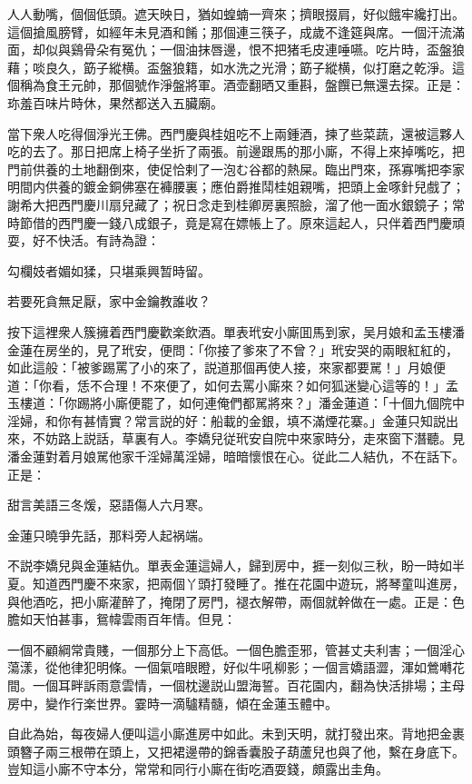 人人動嘴，個個低頭。遮天映日，猶如蝗蝻一齊來；擠眼掇肩，好似餓牢纔打出。這個搶風膀臂，如經年未見酒和餚；那個連三筷子，成歲不逢筵與席。一個汗流滿面，却似與鷄骨朵有冤仇；一個油抹唇邊，恨不把猪毛皮連唾嚥。吃片時，盃盤狼藉；啖良久，筯子縱横。盃盤狼籍，如水洗之光滑；筯子縱横，似打磨之乾淨。這個稱為食王元帥，那個號作淨盤將軍。酒壶翻晒又重斟，盤饌已無還去探。正是：珎羞百味片時休，果然都送入五臟廟。

當下衆人吃得個淨光王佛。西門慶與桂姐吃不上兩鍾酒，揀了些菜蔬，還被這夥人吃的去了。那日把席上椅子坐折了兩張。前邊跟馬的那小廝，不得上來掉嘴吃，把門前供養的土地翻倒來，使促恰剌了一泡む谷都的熱屎。臨出門來，孫寡嘴把李家明間内供養的鍍金銅佛塞在褲腰裏；應伯爵推鬦桂姐親嘴，把頭上金啄針兒戲了；謝希大把西門慶川扇兒藏了；祝日念走到桂卿房裏照臉，溜了他一面水銀鏡子；常時節借的西門慶一錢八成銀子，竟是寫在嫖帳上了。原來這起人，只伴着西門慶頑耍，好不快活。有詩為證：

勾欄妓者媚如猱，只堪乘興暂時留。

若要死貪無足厭，家中金鑰教誰收？

按下這裡衆人簇擁着西門慶歡楽飲酒。單表玳安小廝囬馬到家，吴月娘和孟玉樓潘金蓮在房坐的，見了玳安，便問：「你接了爹來了不曾？」玳安哭的兩眼紅紅的，如此這般：「被爹踢罵了小的來了，説道那個再使人接，來家都要駡！」月娘便道：「你看，恁不合理！不來便了，如何去罵小廝來？如何狐迷變心這等的！」孟玉樓道：「你踢將小廝便罷了，如何連俺們都駡將來？」潘金蓮道：「十個九個院中淫婦，和你有甚情實？常言説的好：船載的金銀，填不滿煙花寨。」金蓮只知説出來，不妨路上説話，草裏有人。李嬌兒従玳安自院中來家時分，走來窗下潛聽。見潘金蓮對着月娘駡他家千淫婦萬淫婦，暗暗懷恨在心。従此二人結仇，不在話下。正是：

甜言美語三冬煖，惡語傷人六月寒。

金蓮只曉爭先話，那料旁人起祸端。

不説李嬌兒與金蓮結仇。單表金蓮這婦人，歸到房中，捱一刻似三秋，盼一時如半夏。知道西門慶不來家，把兩個丫頭打發睡了。推在花園中遊玩，將琴童叫進房，與他酒吃，把小廝灌醉了，掩閉了房門，褪衣解帶，兩個就幹做在一處。正是：色膽如天怕甚事，鴛幃雲雨百年情。但見：

一個不顧綱常貴賤，一個那分上下高低。一個色膽歪邪，管甚丈夫利害；一個淫心蕩漾，從他律犯明條。一個氣喑眼瞪，好似牛吼柳影；一個言嬌語澀，渾如鶯囀花間。一個耳畔訴雨意雲情，一個枕邊説山盟海誓。百花園内，翻為快活排場；主母房中，變作行楽世界。霎時一滴驢精髓，傾在金蓮玉體中。

自此為始，每夜婦人便叫這小廝進房中如此。未到天明，就打發出來。背地把金裹頭簪子兩三根帶在頭上，又把裙邊帶的錦香囊股子葫蘆兒也與了他，繫在身底下。豈知這小廝不守本分，常常和同行小廝在街吃酒耍錢，頗露出圭角。

